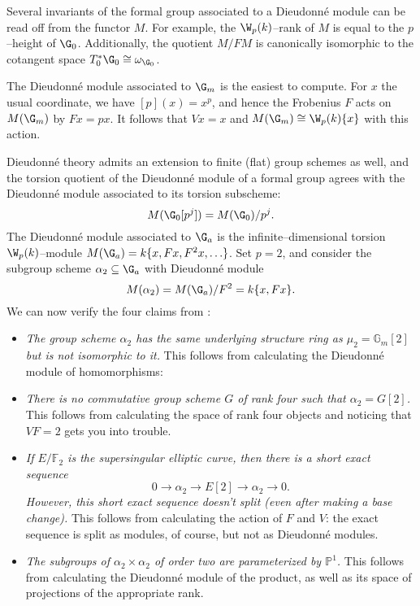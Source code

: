 \begin{remark}
Several invariants of the formal group associated to a Dieudonn\'e module can be read off from the functor $M$.  For example, the $\W_p(k)$--rank of $M$ is equal to the $p$--height of $\G_0$.  Additionally, the quotient $M / FM$ is canonically isomorphic to the cotangent space $T_0^* \G_0 \cong \omega_{\G_0}$.
\end{remark}

\begin{example}
The Dieudonn\'e module associated to $\G_m$ is the easiest to compute.  For $x$ the usual coordinate, we have $[p](x) = x^p$, and hence the Frobenius $F$ acts on $M(\G_m)$ by $Fx = px$.  It follows that $Vx = x$ and $M(\G_m) \cong \W_p(k)\{x\}$ with this action.
\end{example}

\begin{example}\label{WorkedAlpha2Example}
Dieudonn\'e theory admits an extension to finite (flat) group schemes as well, and the torsion quotient of the Dieudonn\'e module of a formal group agrees with the Dieudonn\'e module associated to its torsion subscheme: \[M(\G_0[p^j]) = M(\G_0) / p^j.\]  The  Dieudonn\'e module associated to $\G_a$ is the infinite--dimensional torsion $\W_p(k)$--module $M(\G_a) = k\{x, Fx, F^2 x, \ldots\}$.  Set $p = 2$, and consider the subgroup scheme $\alpha_2 \subseteq \G_a$ with Dieudonn\'e module \[M(\alpha_2) = M(\G_a) / F^2 = k\{x, Fx\}.\]  We can now verify the four claims from :
\begin{itemize}
\item \textit{The group scheme $\alpha_2$ has the same underlying structure ring as $\mu_2 = \mathbb{G}_m[2]$ but is not isomorphic to it.}  This follows from calculating the Dieudonn\'e module of homomorphisms:
\item \textit{There is no commutative group scheme $G$ of rank four such that $\alpha_2 = G[2]$.}  This follows from calculating the space of rank four objects and noticing that $VF = 2$ gets you into trouble.
\item \textit{If $E/\mathbb{F}_2$ is the supersingular elliptic curve, then there is a short exact sequence \[0 \rightarrow \alpha_2 \rightarrow E[2] \rightarrow \alpha_2 \rightarrow 0.\]  However, this short exact sequence doesn't split (even after making a base change).}  This follows from calculating the action of $F$ and $V$: the exact sequence is split as modules, of course, but not as Dieudonn\'e modules.
\item \textit{The subgroups of $\alpha_2 \times \alpha_2$ of order two are parameterized by $\mathbb{P}^1$.}  This follows from calculating the Dieudonn\'e module of the product, as well as its space of projections of the appropriate rank.
\end{itemize}
\end{example}

